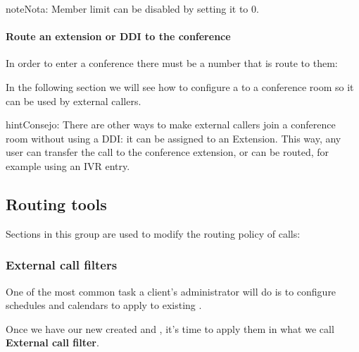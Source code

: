 \documentclass[letterpaper,10pt,spanish]{sphinxmanual}
\begin{document}
\begin{notice}{note}{Nota:}
Member limit can be disabled by setting it to 0.
\end{notice}
\paragraph{Route an extension or DDI to the conference}

In order to enter a conference there must be a number that is route to them:

In the following section we will see how to configure a {\hyperref[administration_portal/client/vpbx/ddis:ddis]{}} to a conference room so it can be used by external callers.

\begin{notice}{hint}{Consejo:}
There are other ways to make external callers join a conference room
without using a DDI: it can be assigned to an Extension. This way, any user
can transfer the call to the conference extension, or can be routed, for
example using an IVR entry.
\end{notice}


\subsection{Routing tools}
\label{administration_portal/client/vpbx/routing_tools/index::doc}\label{administration_portal/client/vpbx/routing_tools/index:routing-tools}
Sections in this group are used to modify the routing policy of calls:


\subsubsection{External call filters}
\label{administration_portal/client/vpbx/routing_tools/external_call_filters:external-call-filters}\label{administration_portal/client/vpbx/routing_tools/external_call_filters:external-filters}\label{administration_portal/client/vpbx/routing_tools/external_call_filters::doc}
One of the most common task a client's administrator will do is to
configure schedules and calendars to apply to existing {\hyperref[administration_portal/client/vpbx/ddis:ddis]{}}.

Once we have our new created {\hyperref[administration_portal/client/vpbx/routing_tools/schedules:schedules]{}} and {\hyperref[administration_portal/client/vpbx/routing_tools/calendars:calendars]{}}, it's time to apply them
in what we call \textbf{External call filter}.
\end{document}

